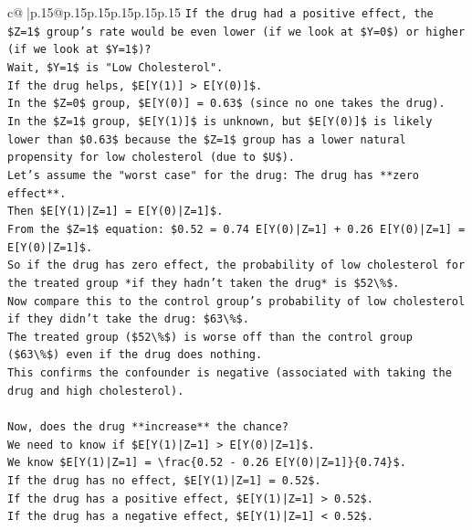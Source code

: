 \documentclass{article}
\begin{document}
{\begin{supertabular}{c@{$\;$}|p{.15\linewidth}@{}p{.15\linewidth}p{.15\linewidth}p{.15\linewidth}p{.15\linewidth}p{.15\linewidth}}
{{{\texttt{If the drug had a positive effect, the \$Z=1\$ group's rate would be even lower (if we look at \$Y=0\$) or higher (if we look at \$Y=1\$)?} \\
\texttt{Wait, \$Y=1\$ is "Low Cholesterol".} \\
\texttt{If the drug helps, \$E{[}Y(1){]} > E{[}Y(0){]}\$.} \\
\texttt{In the \$Z=0\$ group, \$E{[}Y(0){]} = 0.63\$ (since no one takes the drug).} \\
\texttt{In the \$Z=1\$ group, \$E{[}Y(1){]}\$ is unknown, but \$E{[}Y(0){]}\$ is likely lower than \$0.63\$ because the \$Z=1\$ group has a lower natural propensity for low cholesterol (due to \$U\$).} \\
\texttt{Let's assume the "worst case" for the drug: The drug has **zero effect**.} \\
\texttt{Then \$E{[}Y(1)|Z=1{]} = E{[}Y(0)|Z=1{]}\$.} \\
\texttt{From the \$Z=1\$ equation: \$0.52 = 0.74 E{[}Y(0)|Z=1{]} + 0.26 E{[}Y(0)|Z=1{]} = E{[}Y(0)|Z=1{]}\$.} \\
\texttt{So if the drug has zero effect, the probability of low cholesterol for the treated group *if they hadn't taken the drug* is \$52\textbackslash{}\%\$.} \\
\texttt{Now compare this to the control group's probability of low cholesterol if they didn't take the drug: \$63\textbackslash{}\%\$.} \\
\texttt{The treated group (\$52\textbackslash{}\%\$) is worse off than the control group (\$63\textbackslash{}\%\$) even if the drug does nothing.} \\
\texttt{This confirms the confounder is negative (associated with taking the drug and high cholesterol).} \\
\\ 
\texttt{Now, does the drug **increase** the chance?} \\
\texttt{We need to know if \$E{[}Y(1)|Z=1{]} > E{[}Y(0)|Z=1{]}\$.} \\
\texttt{We know \$E{[}Y(1)|Z=1{]} = \textbackslash{}frac\{0.52 {-} 0.26 E{[}Y(0)|Z=1{]}\}\{0.74\}\$.} \\
\texttt{If the drug has no effect, \$E{[}Y(1)|Z=1{]} = 0.52\$.} \\
\texttt{If the drug has a positive effect, \$E{[}Y(1)|Z=1{]} > 0.52\$.} \\
\texttt{If the drug has a negative effect, \$E{[}Y(1)|Z=1{]} < 0.52\$.} \\
\\ 
}}}
\end{supertabular}}
\end{document}
